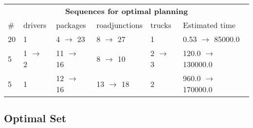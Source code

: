 \documentclass{article}
\begin{document}
                            \begin{center}
                            \begin{tabular}{@{}l|l|l|l|l|l@{}}
                            \multicolumn{6}{c}{\bf \large Sequences for optimal planning}\\
                            \# & drivers & packages & roadjunctions & trucks & Estimated time\\\midrule
                            20&1&4 $\rightarrow$ 23&8 $\rightarrow$ 27&1&0.53 $\rightarrow$ 85000.0\\
5&1 $\rightarrow$ 2&11 $\rightarrow$ 16&8 $\rightarrow$ 10&2 $\rightarrow$ 3&120.0 $\rightarrow$ 130000.0\\
5&1&12 $\rightarrow$ 16&13 $\rightarrow$ 18&2&960.0 $\rightarrow$ 170000.0
                            \end{tabular}
                            \end{center}
                    
                                \subsection*{Optimal Set}
                                
\end{document}
